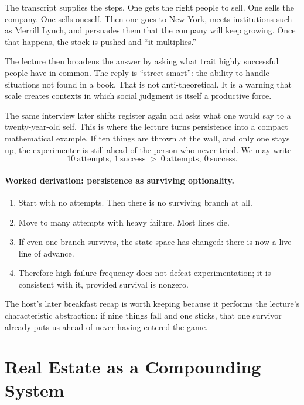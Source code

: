 The transcript supplies the steps. One gets the right people to sell. One sells the company. One sells oneself. Then one goes to New York, meets institutions such as Merrill Lynch, and persuades them that the company will keep growing. Once that happens, the stock is pushed and ``it multiplies.''

The lecture then broadens the answer by asking what trait highly successful people have in common. The reply is ``street smart'': the ability to handle situations not found in a book. That is not anti-theoretical. It is a warning that scale creates contexts in which social judgment is itself a productive force.

The same interview later shifts register again and asks what one would say to a twenty-year-old self. This is where the lecture turns persistence into a compact mathematical example. If ten things are thrown at the wall, and only one stays up, the experimenter is still ahead of the person who never tried. We may write
\begin{equation}
10\ \text{attempts},\ 1\ \text{success} \;>\; 0\ \text{attempts},\ 0\ \text{success}.
\end{equation}

\paragraph{Worked derivation: persistence as surviving optionality.}
\begin{enumerate}
\item Start with no attempts. Then there is no surviving branch at all.
\item Move to many attempts with heavy failure. Most lines die.
\item If even one branch survives, the state space has changed: there is now a live line of advance.
\item Therefore high failure frequency does not defeat experimentation; it is consistent with it, provided survival is nonzero.
\end{enumerate}

The host's later breakfast recap is worth keeping because it performs the lecture's characteristic abstraction: if nine things fall and one sticks, that one survivor already puts us ahead of never having entered the game.

\section{Real Estate as a Compounding System}

